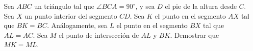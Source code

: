 Sea $ABC$ un triángulo tal que $\angle BCA = 90^{\circ}$, y sea $D$ el pie de la altura desde $C$. Sea $X$ un punto interior del segmento $CD$. Sea $K$ el punto en el segmento $AX$ tal que $BK = BC$. Análogamente, sea $L$ el punto en el segmento $BX$ tal que $AL = AC$. Sea $M$ el punto de intersección de $AL$ y $BK$. \newline 
Demostrar que $MK = ML$.